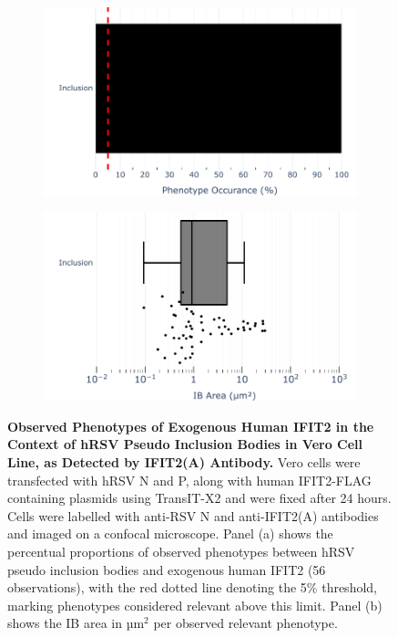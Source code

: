\begin{figure}
    \begin{subfigure}{0.495\textwidth}
        \caption{}
        \includegraphics[width=1\linewidth]{09. Chapter 4/Figs/01. pIB/03. IFIT2/04. IFIT2-FLAG/01. IFIT2A/01. bar_i2a_hnhp.pdf} 
    \end{subfigure}
    \begin{subfigure}{0.495\textwidth}
        \caption{}
        \includegraphics[width=1\linewidth]{09. Chapter 4/Figs/01. pIB/03. IFIT2/04. IFIT2-FLAG/01. IFIT2A/02. box_i2a_hnhp.pdf}
    \end{subfigure}
    \caption[Observed Phenotypes of Exogenous Human IFIT2 in the Context of hRSV Pseudo Inclusion Bodies in Vero Cell Line, as Detected by IFIT2(A) Antibody.]{\textbf{Observed Phenotypes of Exogenous Human IFIT2 in the Context of hRSV Pseudo Inclusion Bodies in Vero Cell Line, as Detected by IFIT2(A) Antibody.} Vero cells were transfected with hRSV N and P, along with human IFIT2-FLAG containing plasmids using TransIT-X2 and were fixed after 24 hours. Cells were labelled with anti-RSV N and anti-IFIT2(A) antibodies and imaged on a confocal microscope. Panel (a) shows the percentual proportions of observed phenotypes between hRSV pseudo inclusion bodies and exogenous human IFIT2 (56 observations), with the red dotted line denoting the 5\% threshold, marking phenotypes considered relevant above this limit. Panel (b) shows the IB area in \(\mbox{µm}^2\) per observed relevant phenotype.}
    \label{fig:Observed Phenotypes of Exogenous Human IFIT2 in the Context of hRSV Pseudo Inclusion Bodies in Vero Cell Line, as Detected by IFIT2(A) Antibody}
\end{figure}

